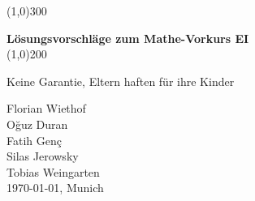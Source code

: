 \begin{titlepage}
	\vspace*{\fill}
	\begin{center}
		\color{gray}\line(1,0){300} \\
		\color{black}
		\vspace{1cm}

		\huge{\bfseries Lösungsvorschläge zum Mathe-Vorkurs EI} \\
		[0.15in]
		\color{gray}\line(1,0){200} \\
		\color{black}

		\vspace{0.5cm}
		\begin{minipage}{8cm}
			\begin{center}
				\large{Keine Garantie, Eltern haften für ihre Kinder}
			\end{center}
		\end{minipage}	
	\end{center}
	\vspace*{\fill}
	\vspace{4cm}
	
	\begin{flushright}
		Florian Wiethof \\
		O\u{g}uz Duran \\
		Fatih Gen\c{c} \\
		Silas Jerowsky \\
		Tobias Weingarten \\
		\today, Munich
	\end{flushright}
\end{titlepage}



\tableofcontents
{}
\thispagestyle{empty}
\clearpage
\setcounter{page}{1}

